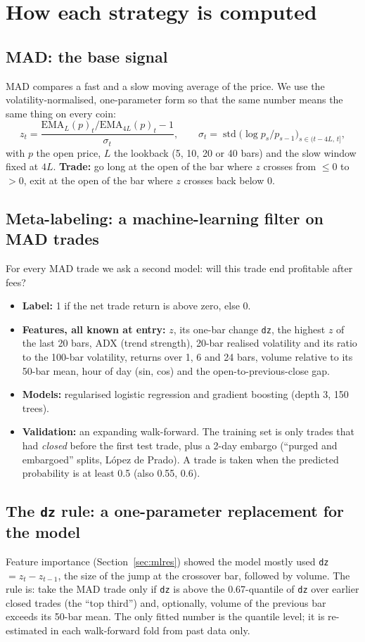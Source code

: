 \documentclass[11pt,a4paper]{article}
\newcommand{\code}[1]{\texttt{#1}}
\begin{document}
\section{How each strategy is computed}
\subsection{MAD: the base signal}\label{sec:madbase}
MAD compares a fast and a slow moving average of the price. We use the volatility-normalised, one-parameter form so that the same number means the same thing on every coin:
\[
z_t=\frac{\text{EMA}_{L}(p)_t/\text{EMA}_{4L}(p)_t-1}{\sigma_t},\qquad \sigma_t=\operatorname{std}\bigl(\log p_s/p_{s-1}\bigr)_{s\in(t-4L,\,t]},
\]
with $p$ the open price, $L$ the lookback (5, 10, 20 or 40 bars) and the slow window fixed at $4L$. \textbf{Trade:} go long at the open of the bar where $z$ crosses from
$\le 0$ to $>0$, exit at the open of the bar where $z$ crosses back below 0.

\subsection{Meta-labeling: a machine-learning filter on MAD trades}
For every MAD trade we ask a second model: will this trade end profitable after fees?
\begin{itemize}
\item \textbf{Label:} 1 if the net trade return is above zero, else 0.
\item \textbf{Features, all known at entry:} $z$, its one-bar change \code{dz}, the highest $z$ of the last 20 bars, ADX (trend strength), 20-bar realised volatility and its ratio to the 100-bar
volatility, returns over 1, 6 and 24 bars, volume relative to its 50-bar mean, hour of day (sin, cos) and the open-to-previous-close gap.
\item \textbf{Models:} regularised logistic regression and gradient boosting (depth 3, 150 trees).
\item \textbf{Validation:} an expanding walk-forward. The training set is only trades that had \emph{closed} before the first test trade, plus a 2-day embargo (``purged and embargoed'' splits,
L\'opez de Prado). A trade is taken when the predicted probability is at least 0.5 (also 0.55, 0.6).
\end{itemize}

\subsection{The \texttt{dz} rule: a one-parameter replacement for the model}
Feature importance (Section~\ref{sec:mlres}) showed the model mostly used \code{dz}$=z_t-z_{t-1}$, the size of the jump at the crossover bar, followed by volume. The rule is: take the
MAD trade only if \code{dz} is above the 0.67-quantile of \code{dz} over earlier closed trades (the ``top third'') and, optionally, volume of the previous bar exceeds its 50-bar mean.
The only fitted number is the quantile level; it is re-estimated in each walk-forward fold from past data only.
\end{document}
